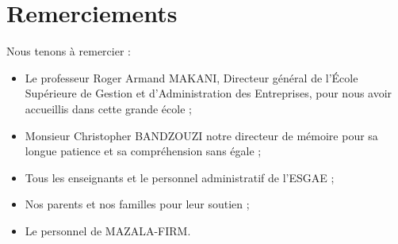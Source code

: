 \chapter*{Remerciements}

Nous tenons à remercier :

\begin{itemize}
  \item Le professeur Roger Armand MAKANI, Directeur général de l’École
      Supérieure de Gestion et d’Administration des Entreprises,
      pour nous avoir accueillis dans cette grande école ;

  \item Monsieur Christopher BANDZOUZI notre directeur de mémoire pour sa
      longue patience et sa compréhension sans égale ;

  \item Tous les enseignants et le personnel administratif de l’ESGAE ;


  \item
      Nos parents et nos familles pour leur soutien ;

  \item
      Le personnel de MAZALA-FIRM.

\end{itemize}
